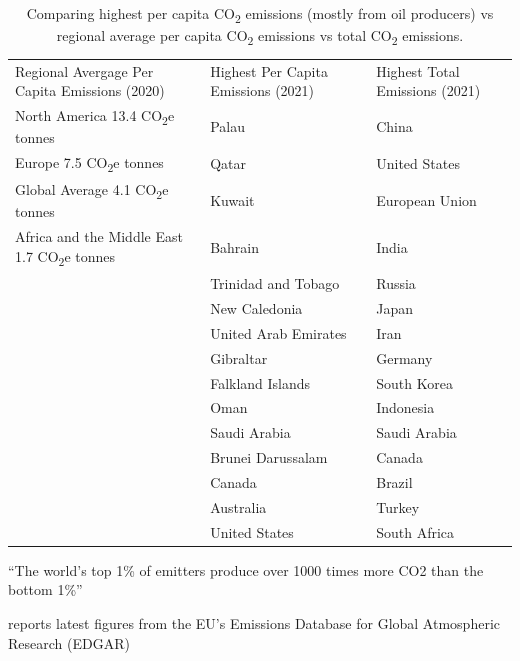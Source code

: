 \documentclass[
  letterpaper,
  DIV=11,
  numbers=noendperiod]{scrartcl}
\begin{document}
\begin{longtable}[]{@{}
  >{\raggedright\arraybackslash}p{}
  >{\raggedright\arraybackslash}p{}
  >{\raggedright\arraybackslash}p{}@{}}
\caption{Comparing highest per capita CO\textsubscript{2} emissions
(mostly from oil producers) vs regional average per capita
CO\textsubscript{2} emissions vs total CO\textsubscript{2}
emissions\citep{ivanovaQuantifyingPotentialClimate2020, worldresourcesinstituteCO2EmissionsMetric2020, europeancommission.jointresearchcentre.CO2EmissionsAll2022, crippaFossilCO2GHG2020, liuMonitoringGlobalCarbon2023}.}\tabularnewline
\toprule\noalign{}
\endfirsthead
\endhead
\bottomrule\noalign{}
\endlastfoot
Regional Avergage Per Capita Emissions (2020) & Highest Per Capita
Emissions (2021) & Highest Total Emissions (2021) \\
North America 13.4 CO\textsubscript{2}e tonnes & Palau & China \\
Europe 7.5 CO\textsubscript{2}e tonnes & Qatar & United States \\
Global Average 4.1 CO\textsubscript{2}e tonnes & Kuwait & European
Union \\
Africa and the Middle East 1.7 CO\textsubscript{2}e tonnes & Bahrain &
India \\
& Trinidad and Tobago & Russia \\
& New Caledonia & Japan \\
& United Arab Emirates & Iran \\
& Gibraltar & Germany \\
& Falkland Islands & South Korea \\
& Oman & Indonesia \\
& Saudi Arabia & Saudi Arabia \\
& Brunei Darussalam & Canada \\
& Canada & Brazil \\
& Australia & Turkey \\
& United States & South Africa \\
\end{longtable}

``The world's top 1\% of emitters produce over 1000 times more CO2 than
the bottom 1\%'' \citet{ieaWorldTopEmitters2023}

\citet{crippaFossilCO2GHG2020} reports latest figures from the EU's
Emissions Database for Global Atmospheric Research (EDGAR)
\end{document}
